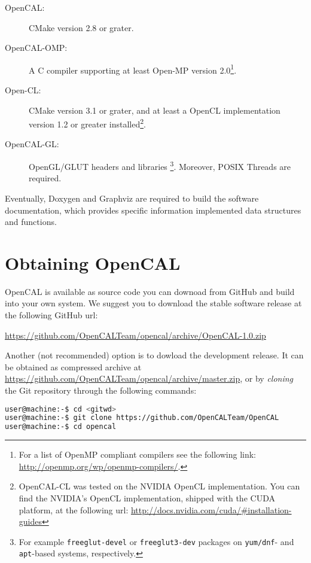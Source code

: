 \begin{description}
\item[OpenCAL: ] CMake version 2.8 or grater.
\item[OpenCAL-OMP: ] A C compiler supporting at least Open-MP version
  2.0\footnote{For a list of OpenMP compliant compilers see the
    following link: \url{http://openmp.org/wp/openmp-compilers/}.}.
\item[Open-CL: ] CMake version 3.1 or grater, and at least a OpenCL
  implementation version 1.2 or greater installed\footnote{OpenCAL-CL
    was tested on the NVIDIA OpenCL implementation. You can find the
    NVIDIA's OpenCL implementation, shipped with the CUDA platform, at
    the following url:
    \url{http://docs.nvidia.com/cuda/\#installation-guides}}.
\item[OpenCAL-GL: ] OpenGL/GLUT headers and libraries \footnote{For
  example \texttt{freeglut-devel} or \texttt{freeglut3-dev} packages
  on \texttt{yum/dnf}- and \texttt{apt}-based systems,
  respectively.}. Moreover, POSIX Threads are required.
\end{description}

\noindent Eventually, Doxygen and Graphviz are required to build the
software documentation, which provides specific information
implemented data structures and functions.

\section{Obtaining OpenCAL}

OpenCAL is available as source code you can downoad from GitHub and
build into your own system. We suggest you to download the stable
software release at the following GitHub url:

\vspace{0.3cm}
\begin{center}
\url{https://github.com/OpenCALTeam/opencal/archive/OpenCAL-1.0.zip}
\end{center}
\vspace{0.3cm}

\noindent Another (not recommended) option is to dowload the
development release. It can be obtained as compressed archive at
\url{https://github.com/OpenCALTeam/opencal/archive/master.zip}, or by
\emph{cloning} the Git repository through the following commands:

\begin{lstlisting}[numbers=none,language=bash]
user@machine:-$ cd <gitwd>
user@machine:-$ git clone https://github.com/OpenCALTeam/OpenCAL
user@machine:-$ cd opencal
\end{lstlisting}

